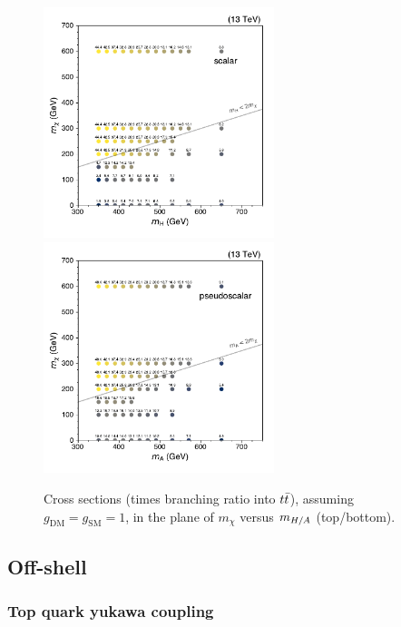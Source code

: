 \begin{figure}[htb!]
    \centering
    \includegraphics[width=0.60\textwidth]{figs/ftan/plot_2d_dmscalar_xsec_totsm} \\
    \includegraphics[width=0.60\textwidth]{figs/ftan/plot_2d_dmpseudo_xsec_totsm}
\caption{Cross sections (times branching ratio into $t\bar{t}$), assuming
$g_\mathrm{DM}=g_\mathrm{SM}=1$, in the plane of $m_\chi$ versus $m_{H/A}$ (top/bottom).
}
\label{fig:dm_2d_xsecs}
\end{figure}



\FloatBarrier

\subsection{Off-shell}

\subsubsection{Top quark yukawa coupling}
\label{sec:ftyukawa}

